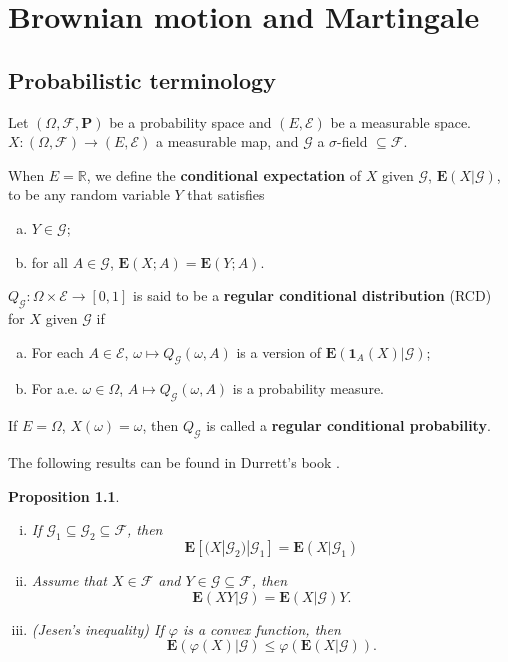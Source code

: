 \documentclass[twoside, 12pt]{book}
\numberwithin{equation}{chapter}
\newtheorem{proposition}[theorem]{Proposition}
\def\cE{{\mathcal E}}
\def\cF{{\mathcal F}}
\def\cG{{\mathcal G}}
\def\mR{{\mathbb R}}
\def\bE{{\mathbf E}}
\def\bP{{\mathbf P}}
\def\leq{\leqslant}
\def\1{{\mathbf{1}}}
\begin{document}
	\chapter{Brownian motion  and Martingale}\label{chapt:BM}
	
	\section{Probabilistic terminology}
	
	Let $(\Omega, \cF, \bP)$ be a probability space and $(E, \cE)$ be a measurable space. $X:(\Omega,\cF)\to (E, \cE)$ a measurable map, and $\cG$ a $\sigma$-field $\subseteq \cF$.  
	
	When $E=\mR$, we define the {\bf conditional expectation} of $X$ given $\cG$, $\bE(X|\cG)$, to be any random variable $Y$ that satisfies 
	\begin{enumerate}[(a)]
		\item $Y\in \cG$; 
		\item for all $A\in \cG$, $\bE(X; A)=\bE(Y; A)$. 
	\end{enumerate}
	
	$Q_{\cG}: \Omega\times \cE\to [0,1]$ is said to be a {\bf {regular conditional distribution}} (RCD) for $X$ given $\cG$ if 
	\begin{enumerate}[(a)]
		\item For each $A\in \cE$, $\omega\mapsto Q_{\cG}(\omega, A)$ is a version of $\bE(\1_A(X)|\cG)$; 
		\item For a.e. $\omega\in \Omega$, $A\mapsto Q_{\cG}(\omega, A)$ is a probability measure. 
	\end{enumerate}
	If $E=\Omega$, $X(\omega)=\omega$, then $Q_{\cG}$ is called a {\bf regular conditional probability}. 
	
	The following results can be found in Durrett's book \cite{durrett2019probability}.  
	\begin{proposition}
		\begin{enumerate}[(i)]
			\item If $\cG_1\subseteq \cG_2\subseteq \cF$, then 
			\begin{equation}
				\bE[(X|\cG_2)|\cG_1]=\bE (X|\cG_1)
			\end{equation}
			\item Assume that $X\in \cF$ and $Y\in \cG\subseteq \cF$, then 
			\begin{equation}
				\bE (XY|\cG)=\bE (X|\cG)Y. 
			\end{equation}
			\item (Jesen's inequality) If $\varphi$ is a convex function, then 
			\begin{equation}
				\bE (\varphi(X)|\cG) \leq \varphi(\bE (X|\cG)). 
			\end{equation}
		\end{enumerate}
	\end{proposition}
	
\end{document}
